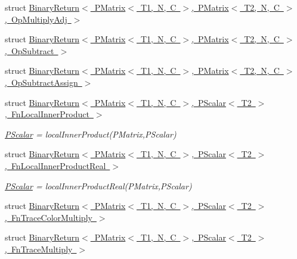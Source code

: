 \begin{DoxyCompactItemize}
\item 
struct \mbox{\hyperlink{structENSEM_1_1BinaryReturn_3_01PMatrix_3_01T1_00_01N_00_01C_01_4_00_01PMatrix_3_01T2_00_01N_00_d45cd1d9e02779a140d03751534bd050}{Binary\+Return$<$ P\+Matrix$<$ T1, N, C $>$, P\+Matrix$<$ T2, N, C $>$, Op\+Multiply\+Adj $>$}}
\item 
struct \mbox{\hyperlink{structENSEM_1_1BinaryReturn_3_01PMatrix_3_01T1_00_01N_00_01C_01_4_00_01PMatrix_3_01T2_00_01N_00_01C_01_4_00_01OpSubtract_01_4}{Binary\+Return$<$ P\+Matrix$<$ T1, N, C $>$, P\+Matrix$<$ T2, N, C $>$, Op\+Subtract $>$}}
\item 
struct \mbox{\hyperlink{structENSEM_1_1BinaryReturn_3_01PMatrix_3_01T1_00_01N_00_01C_01_4_00_01PMatrix_3_01T2_00_01N_00_6e0f512bc0c9bb8e39f94b0a604e2d32}{Binary\+Return$<$ P\+Matrix$<$ T1, N, C $>$, P\+Matrix$<$ T2, N, C $>$, Op\+Subtract\+Assign $>$}}
\item 
struct \mbox{\hyperlink{structENSEM_1_1BinaryReturn_3_01PMatrix_3_01T1_00_01N_00_01C_01_4_00_01PScalar_3_01T2_01_4_00_01FnLocalInnerProduct_01_4}{Binary\+Return$<$ P\+Matrix$<$ T1, N, C $>$, P\+Scalar$<$ T2 $>$, Fn\+Local\+Inner\+Product $>$}}
\begin{DoxyCompactList}\small\item\em \mbox{\hyperlink{classENSEM_1_1PScalar}{P\+Scalar}} = local\+Inner\+Product(\+P\+Matrix,\+P\+Scalar) \end{DoxyCompactList}\item 
struct \mbox{\hyperlink{structENSEM_1_1BinaryReturn_3_01PMatrix_3_01T1_00_01N_00_01C_01_4_00_01PScalar_3_01T2_01_4_00_01FnLocalInnerProductReal_01_4}{Binary\+Return$<$ P\+Matrix$<$ T1, N, C $>$, P\+Scalar$<$ T2 $>$, Fn\+Local\+Inner\+Product\+Real $>$}}
\begin{DoxyCompactList}\small\item\em \mbox{\hyperlink{classENSEM_1_1PScalar}{P\+Scalar}} = local\+Inner\+Product\+Real(\+P\+Matrix,\+P\+Scalar) \end{DoxyCompactList}\item 
struct \mbox{\hyperlink{structENSEM_1_1BinaryReturn_3_01PMatrix_3_01T1_00_01N_00_01C_01_4_00_01PScalar_3_01T2_01_4_00_01FnTraceColorMultiply_01_4}{Binary\+Return$<$ P\+Matrix$<$ T1, N, C $>$, P\+Scalar$<$ T2 $>$, Fn\+Trace\+Color\+Multiply $>$}}
\item 
struct \mbox{\hyperlink{structENSEM_1_1BinaryReturn_3_01PMatrix_3_01T1_00_01N_00_01C_01_4_00_01PScalar_3_01T2_01_4_00_01FnTraceMultiply_01_4}{Binary\+Return$<$ P\+Matrix$<$ T1, N, C $>$, P\+Scalar$<$ T2 $>$, Fn\+Trace\+Multiply $>$}}

\end{DoxyCompactItemize}

